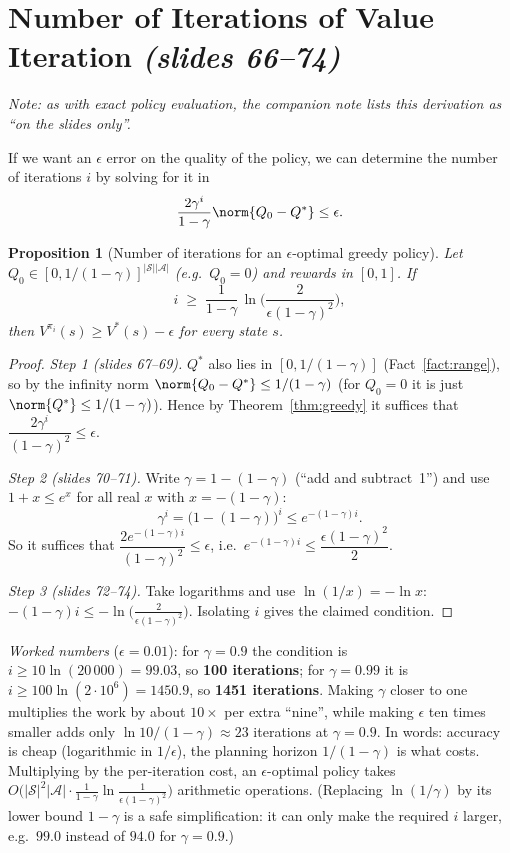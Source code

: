 \documentclass[11pt,a4paper]{article}
\newcommand{\slides}[1]{\emph{(slides #1)}}
\newcommand{\cS}{\mathcal{S}}
\newcommand{\cA}{\mathcal{A}}
\theoremstyle{plain}
\newtheorem{proposition}[theorem]{Proposition}
\theoremstyle{definition}
\theoremstyle{remark}
\begin{document}
\section{Number of Iterations of Value Iteration \slides{66--74}}\label{sec:iters}
\emph{Note: as with exact policy evaluation, the companion note lists this derivation as ``on the slides only''.}

If we want an $\epsilon$ error on the quality of the policy, we can determine the number of iterations $i$ by solving for it in
\[
\frac{2\gamma^i}{1-\gamma}\norm{Q_0-Q^*}\le\epsilon .
\]

\begin{proposition}[Number of iterations for an $\epsilon$-optimal greedy policy]\label{prop:iters}
Let $Q_0\in[0,1/(1-\gamma)]^{|\cS||\cA|}$ (e.g.\ $Q_0=0$) and rewards in $[0,1]$. If
\[
i\;\ge\;\frac{1}{1-\gamma}\,\ln\!\Big(\frac{2}{\epsilon(1-\gamma)^2}\Big),
\]
then $V^{\pi_i}(s)\ge V^*(s)-\epsilon$ for every state $s$.
\end{proposition}
\begin{proof}
\emph{Step 1 (slides 67--69).} $Q^*$ also lies in $[0,1/(1-\gamma)]$ (Fact~\ref{fact:range}), so by the infinity norm $\norm{Q_0-Q^*}\le1/(1-\gamma)$ (for $Q_0=0$ it is just $\norm{Q^*}\le1/(1-\gamma)$). Hence by Theorem~\ref{thm:greedy} it suffices that $\dfrac{2\gamma^i}{(1-\gamma)^2}\le\epsilon$.

\emph{Step 2 (slides 70--71).} Write $\gamma=1-(1-\gamma)$ (``add and subtract~1'') and use $1+x\le e^x$ for all real $x$ with $x=-(1-\gamma)$:
\[
\gamma^i=\big(1-(1-\gamma)\big)^i\le e^{-(1-\gamma)i}.
\]
So it suffices that $\dfrac{2e^{-(1-\gamma)i}}{(1-\gamma)^2}\le\epsilon$, i.e.\ $e^{-(1-\gamma)i}\le\dfrac{\epsilon(1-\gamma)^2}{2}$.

\emph{Step 3 (slides 72--74).} Take logarithms and use $\ln(1/x)=-\ln x$: $-(1-\gamma)i\le-\ln\!\big(\tfrac{2}{\epsilon(1-\gamma)^2}\big)$. Isolating $i$ gives the claimed condition.
\end{proof}

\begin{intuition}
\emph{Worked numbers} ($\epsilon=0.01$): for $\gamma=0.9$ the condition is $i\ge10\ln(20\,000)=99.03$, so \textbf{100 iterations}; for $\gamma=0.99$ it is $i\ge100\ln(2\cdot10^6)=1450.9$, so \textbf{1451 iterations}. Making $\gamma$ closer to one multiplies the work by about $10\times$ per extra ``nine'', while making $\epsilon$ ten times smaller adds only $\ln10/(1-\gamma)\approx23$ iterations at $\gamma=0.9$. In words: accuracy is cheap (logarithmic in $1/\epsilon$), the planning horizon $1/(1-\gamma)$ is what costs. Multiplying by the per-iteration cost, an $\epsilon$-optimal policy takes $O\big(|\cS|^2|\cA|\cdot\tfrac{1}{1-\gamma}\ln\tfrac1{\epsilon(1-\gamma)^2}\big)$ arithmetic operations. (Replacing $\ln(1/\gamma)$ by its lower bound $1-\gamma$ is a safe simplification: it can only make the required $i$ larger, e.g.\ $99.0$ instead of $94.0$ for $\gamma=0.9$.)
\end{intuition}
\end{document}
